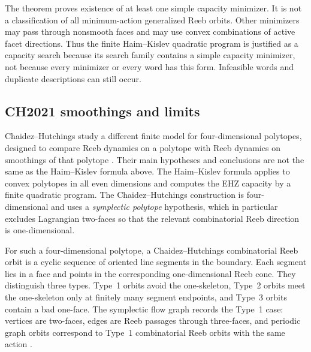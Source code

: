 The theorem proves existence of at least one simple capacity minimizer. It is
not a classification of all minimum-action generalized Reeb orbits. Other
minimizers may pass through nonsmooth faces and may use convex combinations of
active facet directions. Thus the finite Haim--Kislev quadratic program is
justified as a capacity search because its search family contains a simple
capacity minimizer, not because every minimizer or every word has this form.
Infeasible words and duplicate descriptions can still occur.

\subsection{CH2021 smoothings and limits}
\label{subsec:generalized-reeb-orbits-polytopes-ch2021}

Chaidez--Hutchings study a different finite model for four-dimensional
polytopes, designed to compare Reeb dynamics on a polytope with Reeb dynamics
on smoothings of that polytope \cite{CH2021}. Their main hypotheses and
conclusions are not the same as the Haim--Kislev formula above. The
Haim--Kislev formula applies to convex polytopes in all even dimensions and
computes the EHZ capacity by a finite quadratic program. The
Chaidez--Hutchings construction is four-dimensional and uses a
\emph{symplectic polytope} hypothesis, which in particular excludes
Lagrangian two-faces so that the relevant combinatorial Reeb direction is
one-dimensional.

For such a four-dimensional polytope, a Chaidez--Hutchings combinatorial Reeb
orbit is a cyclic sequence of oriented line segments in the boundary. Each
segment lies in a face and points in the corresponding one-dimensional Reeb
cone. They distinguish three types. Type~1 orbits avoid the one-skeleton,
Type~2 orbits meet the one-skeleton only at finitely many segment endpoints,
and Type~3 orbits contain a bad one-face. The symplectic flow graph records
the Type~1 case: vertices are two-faces, edges are Reeb passages through
three-faces, and periodic graph orbits correspond to Type~1 combinatorial Reeb
orbits with the same action \cite[Proposition~2.2]{CH2021}.

